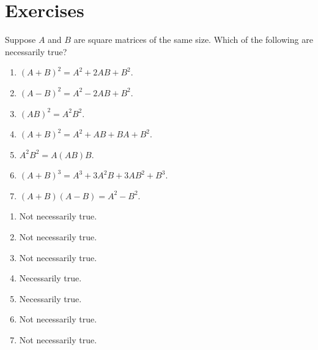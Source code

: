 \section*{Exercises}

\begin{enumialphparenastyle}

\begin{ex}
  Suppose $A$ and $B$ are square matrices of the same size. Which of
  the following are necessarily true?

  \begin{enumerate}
  \item $(A+B) ^{2}=A^{2}+2AB+B^{2}$.
  \item $(A-B) ^{2}=A^{2}-2AB+B^{2}$.
  \item $(AB) ^{2}=A^{2}B^{2}$.
  \item $(A+B) ^{2}=A^{2}+AB+BA+B^{2}$.
  \item $A^{2}B^{2}=A(AB) B$.
  \item $(A+B) ^{3}=A^{3}+3A^{2}B+3AB^{2}+B^{3}$.
  \item $(A+B) (A-B) =A^{2}-B^{2}$.
  \end{enumerate}

  \begin{sol}
    \begin{enumerate}
    \item Not necessarily true.  
    \item Not necessarily true.
    \item Not necessarily true.
    \item Necessarily true.
    \item Necessarily true.
    \item Not necessarily true.
    \item Not necessarily true. 
    \end{enumerate}
  \end{sol}
\end{ex}

\end{enumialphparenastyle}
